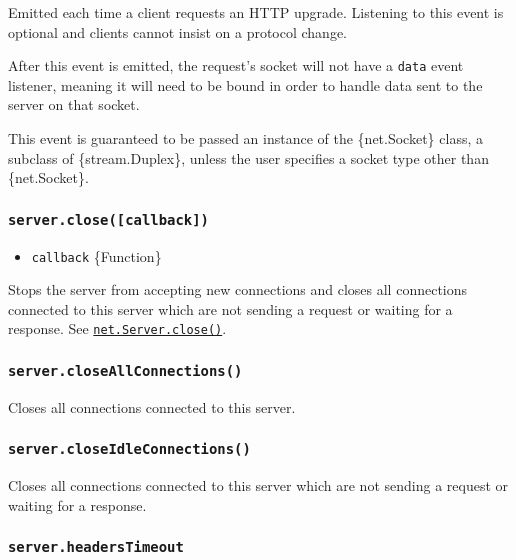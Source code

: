 Emitted each time a client requests an HTTP upgrade. Listening to this
event is optional and clients cannot insist on a protocol change.

After this event is emitted, the request's socket will not have a
\texttt{\textquotesingle{}data\textquotesingle{}} event listener,
meaning it will need to be bound in order to handle data sent to the
server on that socket.

This event is guaranteed to be passed an instance of the \{net.Socket\}
class, a subclass of \{stream.Duplex\}, unless the user specifies a
socket type other than \{net.Socket\}.

\subsubsection{\texorpdfstring{\texttt{server.close({[}callback{]})}}{server.close({[}callback{]})}}\label{server.closecallback}

\begin{itemize}
\tightlist
\item
  \texttt{callback} \{Function\}
\end{itemize}

Stops the server from accepting new connections and closes all
connections connected to this server which are not sending a request or
waiting for a response. See
\href{net.md\#serverclosecallback}{\texttt{net.Server.close()}}.

\subsubsection{\texorpdfstring{\texttt{server.closeAllConnections()}}{server.closeAllConnections()}}\label{server.closeallconnections}

Closes all connections connected to this server.

\subsubsection{\texorpdfstring{\texttt{server.closeIdleConnections()}}{server.closeIdleConnections()}}\label{server.closeidleconnections}

Closes all connections connected to this server which are not sending a
request or waiting for a response.

\subsubsection{\texorpdfstring{\texttt{server.headersTimeout}}{server.headersTimeout}}\label{server.headerstimeout}

